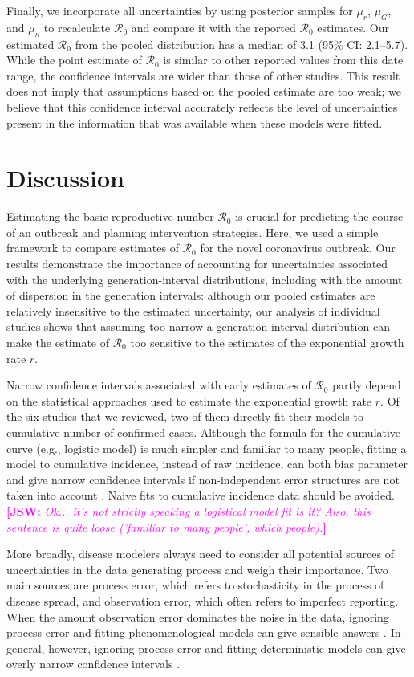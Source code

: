 \documentclass[12pt]{article}
\newcommand{\Rx}[1]{\ensuremath{{\mathcal R}_{#1}}}
\newcommand{\Ro}{\Rx{0}\xspace}
\newcommand{\comment}[3]{\textcolor{#1}{\textbf{[#2: }\textsl{#3}\textbf{]}}}
\newcommand{\jsw}[1]{\comment{magenta}{JSW}{#1}}
\begin{document}
Finally, we incorporate all uncertainties by using posterior samples for $\mu_r$, $\mu_G$, and $\mu_\kappa$ to recalculate \Ro and compare it with the reported \Ro estimates.
Our estimated \Ro from the pooled distribution has a median of 3.1 (95\% CI: 2.1--5.7).
While the point estimate of \Ro is similar to other reported values from this date range, the confidence intervals are wider than those of other studies.
This result does not imply that assumptions based on the pooled estimate are too weak;
we believe that this confidence interval accurately reflects the level of uncertainties present in the information that was available when these models were fitted.

\section{Discussion}

Estimating the basic reproductive number \Ro is crucial for predicting the course of an outbreak and planning intervention strategies.
Here, we used a simple framework \citep{park2019practical} to compare estimates of \Ro for the novel coronavirus outbreak.
Our results demonstrate the importance of accounting for uncertainties associated with the underlying generation-interval distributions, including with the amount of dispersion in the generation intervals:
although our pooled estimates are relatively insensitive to the estimated uncertainty, our analysis of individual studies shows that assuming too narrow a generation-interval distribution can make the estimate of \Ro too sensitive to the estimates of the exponential growth rate $r$.

Narrow confidence intervals associated with early estimates of \Ro partly depend on the statistical approaches used to estimate the exponential growth rate $r$.
Of the six studies that we reviewed, two of them directly fit their models to cumulative number of confirmed cases.
Although the formula for the cumulative curve (e.g., logistic model) is much simpler and familiar to many people, fitting a model to cumulative incidence, instead of raw incidence, can both bias parameter and give narrow confidence intervals if non-independent error structures are not taken into account \citep{ma2014estimating, king2015avoidable}.
Naive fits to cumulative incidence data should be avoided.
\jsw{Ok... it's not strictly speaking a logistical model fit is it?  Also, this sentence is quite loose ('familiar to many people', which people).}

More broadly, disease modelers always need to consider all potential sources of uncertainties in the data generating process and weigh their importance.
Two main sources are process error, which refers to stochasticity in the process of disease spread, and observation error, which often refers to imperfect reporting.
When the amount observation error dominates the noise in the data, ignoring process error and fitting phenomenological models can give sensible answers \citep{ma2014estimating}.
In general, however, ignoring process error and fitting deterministic models can give overly narrow confidence intervals \citep{king2015avoidable}.
\end{document}
